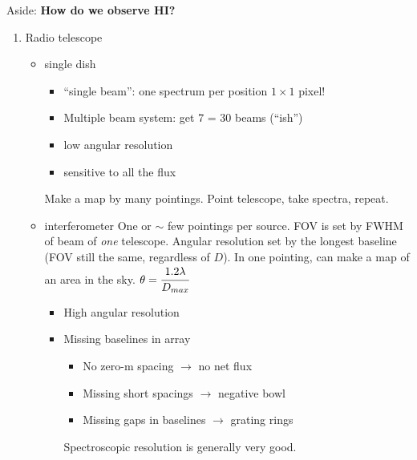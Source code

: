 \documentclass[12pt]{article}
\begin{document}
\begin{framed}
    Aside: \textbf{How do we observe HI?}
    \begin{enumerate}
        \item Radio telescope
            \begin{itemize}
                \item single dish
                    \begin{itemize}
                        \item ``single beam'': one spectrum per position
                            $1\times1$ pixel!
                        \item Multiple beam system: get 7 = 30 beams (``ish'')
                        \item low angular resolution
                        \item sensitive to all the flux
                    \end{itemize}
                    Make a map by many pointings. Point telescope, take spectra,
                    repeat.
                \item interferometer
                One or $\sim$ few pointings per source. FOV is set by FWHM of beam
                of \emph{one} telescope. Angular resolution set by the longest
                baseline (FOV still the same, regardless of $D$). In one pointing,
                can make a map of an area in the sky. $\theta = \cfrac{1.2\lambda}{D_{max}}$
                \begin{itemize}
                    \item High angular resolution
                    \item Missing baselines in array
                        \begin{itemize}
                            \item No zero-m spacing $\rightarrow$ no net flux
                            \item Missing short spacings $\rightarrow$ negative bowl
                            \item Missing gaps in baselines $\rightarrow$ grating rings
                        \end{itemize}
                        Spectroscopic resolution is generally very good.
                \end{itemize}
            \end{itemize}
    \end{enumerate}
\end{framed}
\end{document}
